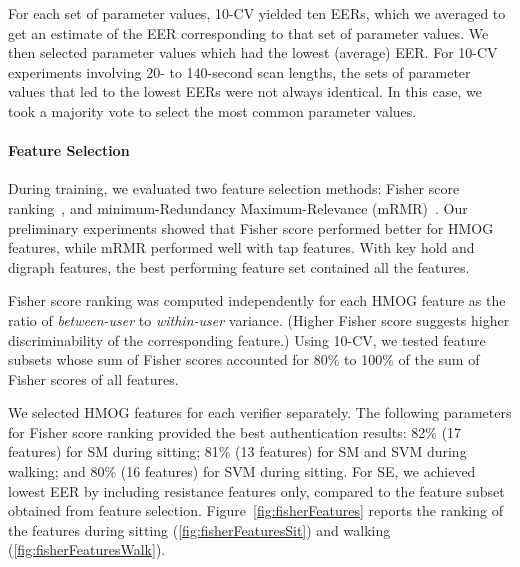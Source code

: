 %
For each set of parameter values, 10-CV yielded ten EERs, which we averaged to get an estimate of the EER corresponding to that set of parameter values. We then selected parameter values which had the lowest (average) EER. For 10-CV experiments involving 20- to 140-second scan lengths, the sets of parameter values that led to the lowest EERs were not always identical. In this case, we took a majority vote to select the most common parameter values.

\paragraph{Feature Selection} 
%
During training, we evaluated two feature selection methods: Fisher score ranking~\cite{duda2001pattern}, 
and minimum-Redundancy Maximum-Relevance (mRMR)~\cite{mRMR}. 
Our preliminary experiments showed that Fisher score performed better for HMOG features, while mRMR performed well with tap features. With key hold and digraph features, the best performing feature set contained all the features.

Fisher score ranking 
was computed independently for each HMOG feature as the ratio of {\em between-user} 
to {\em within-user} variance. (Higher Fisher score suggests higher 
discriminability of the corresponding feature.) Using 10-CV, we tested feature 
subsets whose sum of Fisher scores accounted for 80\% to 100\% of the 
sum of Fisher scores of all features.  

We selected HMOG features for each verifier separately. The following parameters 
for Fisher score ranking provided the best authentication results: 82\% (17 features) for SM
during sitting; 81\% (13 features) for SM and SVM during walking; and 80\% (16 features) for SVM during sitting. For SE, we achieved lowest EER by including resistance features only, compared to the feature subset obtained from feature selection. %
%
%
Figure~\ref{fig:fisherFeatures} reports the ranking of the features during sitting (\ref{fig:fisherFeaturesSit}) and walking (\ref{fig:fisherFeaturesWalk}).



